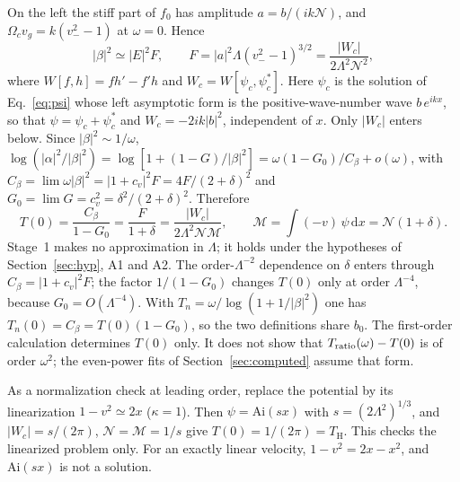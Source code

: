 \documentclass[10pt,a4paper]{article}
\newcommand{\HawkingT}{T_{\mathrm H}}
\newcommand{\dd}{\mathrm d}
\newcommand{\Ai}{\mathrm{Ai}}
\begin{document}
On the left the stiff part of $f_0$ has amplitude $a=b/(ik\mathcal{N})$, and
$\Omega_cv_g=k(v_-^2-1)$ at $\omega=0$. Hence
\begin{equation}
 |\beta|^2\simeq|E|^2F,\qquad
 F=|a|^2\Lambda(v_-^2-1)^{3/2}=\frac{|W_c|}{2\Lambda^2\mathcal{N}^2},
\end{equation}
where $W[f,h]=fh'-f'h$ and $W_c=W[\psi_c,\psi_c^*]$. Here $\psi_c$ is the
solution of Eq.~\eqref{eq:psi} whose left asymptotic form is the
positive-wave-number wave $b\,e^{ikx}$, so that $\psi=\psi_c+\psi_c^*$ and
$W_c=-2ik|b|^2$, independent of $x$. Only $|W_c|$ enters below.
Since $|\beta|^2\sim1/\omega$,
$\log(|\alpha|^2/|\beta|^2)=\log[1+(1-G)/|\beta|^2]=\omega(1-G_0)/C_\beta+o(\omega)$,
with $C_\beta=\lim\omega|\beta|^2=|1+c_v|^2F=4F/(2+\delta)^2$ and
$G_0=\lim G=c_v^2=\delta^2/(2+\delta)^2$. Therefore
\begin{equation}
 \boxed{T(0)=\frac{C_\beta}{1-G_0}=\frac{F}{1+\delta}
 =\frac{|W_c|}{2\Lambda^2\mathcal{N}\mathcal{M}},\qquad \mathcal{M}=\int(-v)\,\psi\,\dd x=\mathcal{N}(1+\delta).}
 \label{eq:T0}
\end{equation}
Stage~1 makes no approximation in $\Lambda$; it holds under the hypotheses
of Section~\ref{sec:hyp}, A1 and A2. The order-$\Lambda^{-2}$ dependence on
$\delta$ enters through $C_\beta=|1+c_v|^2F$; the factor $1/(1-G_0)$ changes
$T(0)$ only at order $\Lambda^{-4}$, because $G_0=O(\Lambda^{-4})$. With
$T_n=\omega/\log(1+1/|\beta|^2)$ one has $T_n(0)=C_\beta=T(0)(1-G_0)$, so
the two definitions share $b_0$. The first-order calculation determines
$T(0)$ only. It does not show that $T_{\rm ratio}(\omega)-T(0)$ is of order
$\omega^2$; the even-power fits of Section~\ref{sec:computed} assume that
form.

As a normalization check at leading order, replace the potential by its
linearization $1-v^2\simeq2x$ ($\kappa=1$). Then $\psi=\Ai(sx)$ with
$s=(2\Lambda^2)^{1/3}$, and $|W_c|=s/(2\pi)$, $\mathcal{N}=\mathcal{M}=1/s$ give
$T(0)=1/(2\pi)=\HawkingT$. This checks the linearized problem only. For an
exactly linear velocity, $1-v^2=2x-x^2$, and $\Ai(sx)$ is not a solution.
\end{document}
